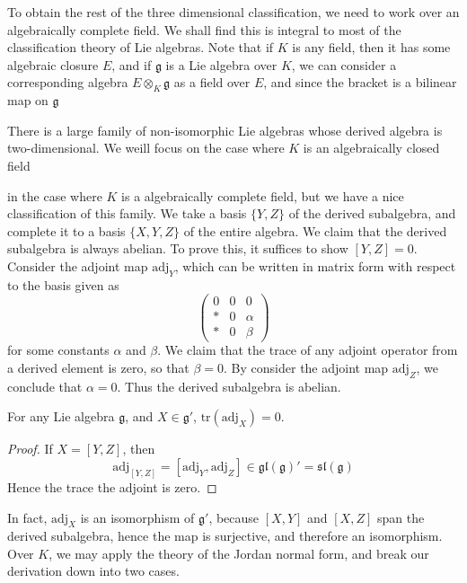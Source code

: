 To obtain the rest of the three dimensional classification, we need to work over an algebraically complete field. We shall find this is integral to most of the classification theory of Lie algebras. Note that if $K$ is any field, then it has some algebraic closure $E$, and if $\mathfrak{g}$ is a Lie algebra over $K$, we can consider a corresponding algebra $E \otimes_K \mathfrak{g}$ as a field over $E$, and since the bracket is a bilinear map on $\mathfrak{g}$ 

There is a large family of non-isomorphic Lie algebras whose derived algebra is two-dimensional. We weill focus on the case where $K$ is an algebraically closed field

in the case where $K$ is a algebraically complete field, but we have a nice classification of this family. We take a basis $\{ Y,Z \}$ of the derived subalgebra, and complete it to a basis $\{ X,Y,Z \}$ of the entire algebra. We claim that the derived subalgebra is always abelian. To prove this, it suffices to show $[Y,Z] = 0$. Consider the adjoint map $\text{adj}_Y$, which can be written in matrix form with respect to the basis given as
%
\[ \begin{pmatrix} 0 & 0 & 0 \\ * & 0 & \alpha \\ * & 0 & \beta \end{pmatrix} \]
%
for some constants $\alpha$ and $\beta$. We claim that the trace of any adjoint operator from a derived element is zero, so that $\beta = 0$. By consider the adjoint map $\text{adj}_Z$, we conclude that $\alpha = 0$. Thus the derived subalgebra is abelian.

\begin{lemma}
    For any Lie algebra $\mathfrak{g}$, and $X \in \mathfrak{g}'$, $\text{tr}(\text{adj}_X) = 0$.
\end{lemma}
\begin{proof}
    If $X = [Y,Z]$, then
    \[ \text{adj}_{[Y,Z]} = [\text{adj}_Y, \text{adj}_Z] \in \mathfrak{gl}(\mathfrak{g})' = \mathfrak{sl}(\mathfrak{g}) \]
    Hence the trace the adjoint is zero.
\end{proof}

In fact, $\text{adj}_X$ is an isomorphism of $\mathfrak{g}'$, because $[X,Y]$ and $[X,Z]$ span the derived subalgebra, hence the map is surjective, and therefore an isomorphism. Over $K$, we may apply the theory of the Jordan normal form, and break our derivation down into two cases.

